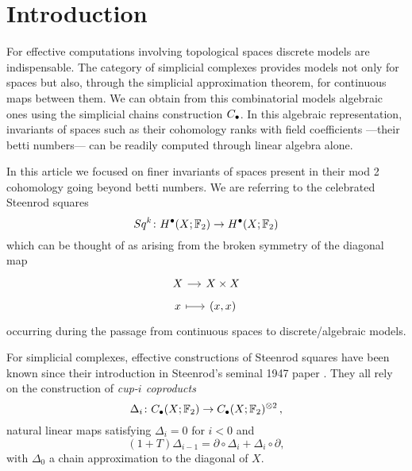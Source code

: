 
\section{Introduction}

For effective computations involving topological spaces discrete models are indispensable.
The category of simplicial complexes provides models not only for spaces but also, through the simplicial approximation theorem, for continuous maps between them.
We can obtain from this combinatorial models algebraic ones using the simplicial chains construction $C_\bullet$.
In this algebraic representation, invariants of spaces such as their cohomology ranks with field coefficients ---their betti numbers--- can be readily computed through linear algebra alone.

In this article we focused on finer invariants of spaces present in their mod 2 cohomology going beyond betti numbers.
We are referring to the celebrated Steenrod squares
\begin{equation*}
Sq^k \colon H^\bullet(X; \mathbb{F}_2) \to H^\bullet(X; \mathbb{F}_2)
\end{equation*}
which can be thought of as arising from the broken symmetry of the diagonal map
\begin{equation*}
\begin{tikzcd}[column sep=small, row sep=tiny]
X \arrow[r] & X \times X \\
x \arrow[r, mapsto] & (x,x)
\end{tikzcd}
\end{equation*}
occurring during the passage from continuous spaces to discrete/algebraic models.

For simplicial complexes, effective constructions of Steenrod squares have been known since their introduction in Steenrod's seminal 1947 paper \cite{steenrod47}.
They all rely on the construction of \textit{cup-$i$ coproducts}
\begin{equation*}
\Delta_i \colon C_\bullet(X; \mathbb{F}_2)  \to C_\bullet(X; \mathbb{F}_2)^{\otimes 2}\,,
\end{equation*}
natural linear maps satisfying $\Delta_i = 0$ for $i < 0$ and
\begin{equation*}
(1 + T) \Delta_{i-1} = \partial \circ \Delta_i + \Delta_i \circ \partial,
\end{equation*}
with $\Delta_0$ a chain approximation to the diagonal of $X$.

